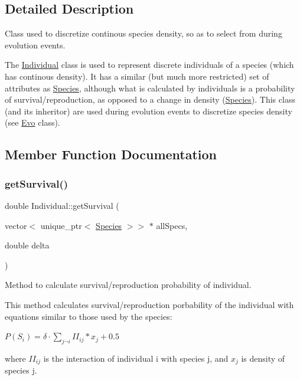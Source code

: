 \subsection{Detailed Description}
Class used to discretize continous species density, so as to select from during evolution events. 

The \hyperlink{classIndividual}{Individual} class is used to represent discrete individuals of a species (which has continous density). It has a similar (but much more restricted) set of attributes as \hyperlink{classSpecies}{Species}, although what is calculated by individuals is a probability of survival/reproduction, as opposed to a change in density (\hyperlink{classSpecies}{Species}). This class (and its inheritor) are used during evolution events to discretize species density (see \hyperlink{classEvo}{Evo} class). 

\subsection{Member Function Documentation}
\mbox{\label{classIndividual_a895954f2c3a683dd3bd7475651a38160}} 
\subsubsection{\texorpdfstring{get\+Survival()}{getSurvival()}}
{\footnotesize\ttfamily double Individual\+::get\+Survival (\begin{DoxyParamCaption}\item[{vector$<$ unique\+\_\+ptr$<$ \hyperlink{classSpecies}{Species} $>$$>$ $\ast$}]{all\+Specs,  }\item[{double}]{delta }\end{DoxyParamCaption})\hspace{0.3cm}{\ttfamily [virtual]}}



Method to calculate survival/reproduction probability of individual. 

This method calculates survival/reproduction porbability of the individual with equations similar to those used by the species\+:

$P(S_i) = \delta \cdot \sum_{j \neg i} II_{ij}*x_j +0.5$

where $II_{ij}$ is the interaction of individual i with species j, and $x_j$ is density of species j.


